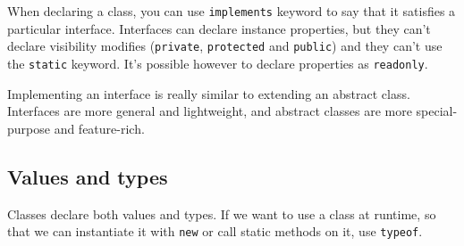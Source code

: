 \documentclass[french]{article}
\begin{document}
When declaring a class, you can use \lstinline{implements} keyword to say that it satisfies a particular interface. Interfaces can declare instance properties, but they can't declare visibility modifies (\lstinline{private}, \lstinline{protected} and \lstinline{public}) and they can't use the \lstinline{static} keyword. It's possible however to declare properties as \lstinline{readonly}.


Implementing an interface is really similar to extending an abstract class. Interfaces are more general and lightweight, and abstract classes are more special-purpose and feature-rich.

\subsection{Values and types}

Classes declare both values and types. If we want to use a class at runtime, so that we can instantiate it with \lstinline{new} or call static methods on it, use \lstinline{typeof}.
\end{document}
